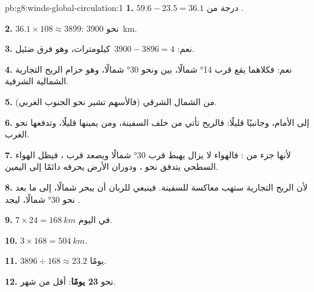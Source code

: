 \begin{solution}{pb:g8:winds-global-circulation:1}
\textbf{1.} $59.6 - 23.5 = 36.1$ درجة من .

\textbf{2.} $36.1 \times 108 \approx 3899$: نحو \qty{3900}{km}.

\textbf{3.} نعم: $3900 - 3896 = 4$~كيلومترات، وهو فرق ضئيل.

\textbf{4.} نعم: فكلاهما يقع قرب \ang{14} شمالًا، بين  ونحو
\ang{30} شمالًا، وهو حزام الريح التجارية الشمالية الشرقية.

\textbf{5.} من الشمال الشرقي (فالأسهم تشير نحو
الجنوب الغربي).

\textbf{6.} إلى الأمام، وجانبيًا قليلًا: فالريح تأتي من خلف
السفينة، ومن يمينها قليلًا، وتدفعها نحو الغرب.

\textbf{7.} لأنها جزء من : فالهواء لا يزال يهبط قرب
\ang{30} شمالًا ويصعد قرب ، فيظل الهواء السطحي يتدفق
نحو ، ودوران الأرض يحرفه دائمًا إلى
اليمين.

\textbf{8.} لأن الريح التجارية ستهب معاكسة للسفينة. فينبغي للربان أن
يبحر شمالًا، إلى ما بعد نحو \ang{30} شمالًا، ليجد .

\textbf{9.} $7 \times 24 = \qty{168}{km}$ في اليوم.

\textbf{10.} $3 \times 168 = \qty{504}{km}$.

\textbf{11.} $3896 \div 168 \approx 23.2$ يومًا.

\textbf{12.} نحو \textbf{23 يومًا}: أقل من شهر.
\end{solution}
